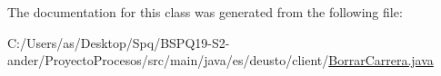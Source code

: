 The documentation for this class was generated from the following file\+:\begin{DoxyCompactItemize}
\item 
C\+:/\+Users/as/\+Desktop/\+Spq/\+B\+S\+P\+Q19-\/\+S2-\/ander/\+Proyecto\+Procesos/src/main/java/es/deusto/client/\mbox{\hyperlink{_borrar_carrera_8java}{Borrar\+Carrera.\+java}}\end{DoxyCompactItemize}
